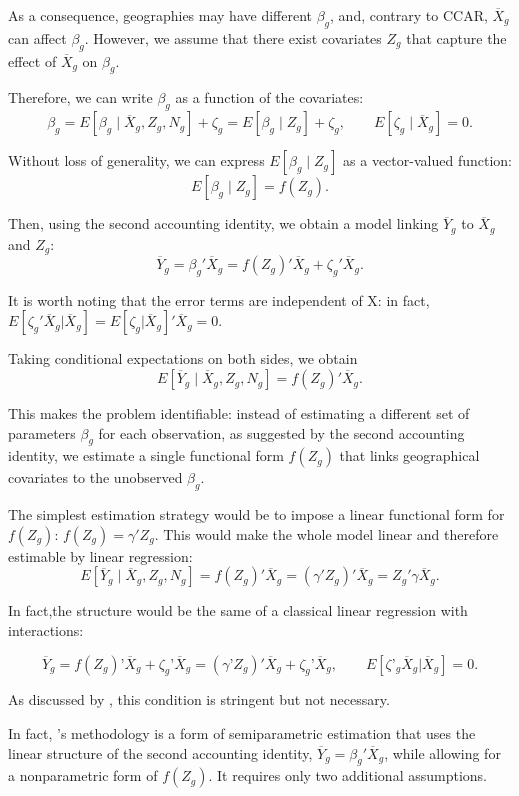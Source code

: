 As a consequence, geographies may have different $\beta_g$, and, contrary to CCAR, $\overline{X}_g$ can affect $\beta_g$. However, we assume that there exist covariates $Z_g$ that capture the effect of $\overline{X}_g$ on $\beta_g$.

Therefore, we can write $\beta_g$ as a function of the covariates:
\[
\beta_g = E[\beta_g \mid \overline{X}_g, Z_g, N_g] + \zeta_g = E[\beta_g \mid Z_g] + \zeta_g,
\qquad E[\zeta_g \mid \overline{X}_g] = 0.
\]

Without loss of generality, we can express $E[\beta_g \mid Z_g]$ as a vector-valued function:
\[
E[\beta_g \mid Z_g] = f(Z_g).
\]

Then, using the second accounting identity, we obtain a model linking $\overline{Y}_g$ to $\overline{X}_g$ and $Z_g$:
\[
\overline{Y}_g = \beta_g'\overline{X}_g = f(Z_g)'\overline{X}_g + \zeta_g'\overline{X}_g.
\]

It is worth noting that the error terms are independent of X: in fact, $E[\zeta_g'\overline{X}_g | \overline{X}_g] = E[\zeta_g | \overline{X}_g]'\overline{X}_g = 0$.


Taking conditional expectations on both sides, we obtain
\[
E[\overline{Y}_g \mid \overline{X}_g, Z_g, N_g] = f(Z_g)'\overline{X}_g.
\]

This makes the problem identifiable: instead of estimating a different set of parameters $\beta_g$ for each observation, as suggested by the second accounting identity, we estimate a single functional form $f(Z_g)$ that links geographical covariates to the unobserved $\beta_g$.

The simplest estimation strategy would be to impose a linear functional form for $f(Z_g)$: $f(Z_g)=\gamma' Z_g$. This would make the whole model linear and therefore estimable by linear regression:
\[
E[\overline{Y}_g \mid \overline{X}_g, Z_g, N_g] = f(Z_g)'\overline{X}_g = (\gamma' Z_g)'\overline{X}_g = Z_g'\gamma \overline{X}_g.
\]

In fact,the structure would be the same of a classical linear regression with interactions:

\[
\overline{Y}_g = f(Z_g)’\overline{X}_g+\zeta_g’\overline{X}_g = (\gamma’Z_g)' \overline{X}_g + \zeta_g’ \overline{X}_g,
\qquad E[\zeta’_g\overline{X}_g|\overline{X}_g]=0.
\]


As discussed by \citet{mccartan2025identificationsemiparametricestimationconditional}, this condition is stringent but not necessary.

In fact, \citet{mccartan2025identificationsemiparametricestimationconditional}'s methodology is a form of semiparametric estimation that uses the linear structure of the second accounting identity, $\overline{Y}_g = \beta_g'\overline{X}_g$, while allowing for a nonparametric form of $f(Z_g)$. It requires only two additional assumptions.

